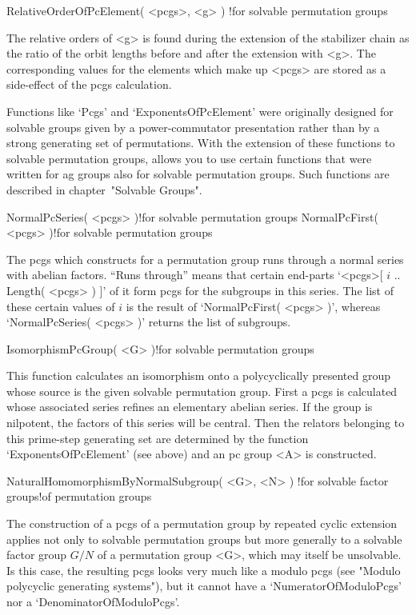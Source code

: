 \>RelativeOrderOfPcElement( <pcgs>, <g> )%
  !{for solvable permutation groups}

The  relative  orders  of  <g>  is  found during   the   extension of the
stabilizer chain as the ratio  of the orbit  lengths before and after the
extension with <g>. The corresponding values  for the elements which make
up <pcgs> are stored as a side-effect of the pcgs calculation.

Functions like `Pcgs' and `ExponentsOfPcElement' were originally designed
for solvable groups given by  a power-commutator presentation rather than
by a strong generating  set of permutations.  With the extension of these
functions  to  solvable  permutation groups, {\GAP}   allows  you to  use
certain  functions that were written   for  ag groups  also for  solvable
permutation  groups.  Such functions  are  described in chapter~"Solvable
Groups".

\>NormalPcSeries( <pcgs> )!{for solvable permutation groups}
\>NormalPcFirst( <pcgs> )!{for solvable permutation groups}

The pcgs  which {\GAP} constructs for  a permutation group runs through a
normal  series with abelian  factors. ``Runs through'' means that certain
end-parts  `<pcgs>[ $i$ ..  Length( <pcgs> ) ]'  of it form  pcgs for the
subgroups in this series. The list of these certain values  of $i$ is the
result of `NormalPcFirst( <pcgs>  )', whereas `NormalPcSeries( <pcgs>  )'
returns the list of subgroups.

\>IsomorphismPcGroup( <G> )!{for solvable permutation groups}

This function calculates an  isomorphism onto a  polycyclically presented
group whose source is the given solvable permutation  group. First a pcgs
is  calculated whose  associated  series  refines an  elementary  abelian
series. If the  group is  nilpotent, the  factors of this  series will be
central. Then  the relators belonging  to this  prime-step generating set
are determined by the function  `ExponentsOfPcElement' (see above) and an
pc group <A> is constructed.

\>NaturalHomomorphismByNormalSubgroup( <G>, <N> )%
  !{for solvable factor groups!of permutation groups}

The  construction of  a pcgs of  a  permutation group  by repeated cyclic
extension applies   not  only to  solvable permutation   groups  but more
generally to a solvable  factor group $G/N$  of a permutation group  <G>,
which may itself  be unsolvable. Is this case,  the  resulting pcgs looks
very    much like a  modulo    pcgs  (see "Modulo polycyclic   generating
systems"),   but  it   cannot  have   a    `NumeratorOfModuloPcgs' nor  a
`DenominatorOfModuloPcgs'.

